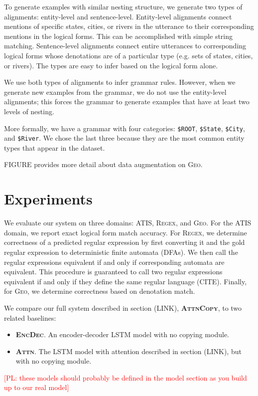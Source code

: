 \documentclass[11pt,letterpaper]{article}
\newcommand{\encdec}{\textsc{EncDec}\xspace}
\newcommand{\attn}{\textsc{Attn}\xspace}
\newcommand{\attncopy}{\textsc{AttnCopy}\xspace}
\newcommand{\atis}{\textsc{ATIS}\xspace}
\newcommand{\regex}{\textsc{Regex}\xspace}
\newcommand{\geo}{\textsc{Geo}\xspace}
\newcommand\pl[1]{\textcolor{red}{[PL: #1]}}
\begin{document}
To generate examples with similar nesting structure,
we generate two types of alignments: entity-level and sentence-level.
Entity-level alignments connect mentions of specific states, cities, or rivers
in the utterance to their corresponding mentions in the logical forms.
This can be accomplished with simple string matching.
Sentence-level alignments connect entire utterances to 
corresponding logical forms whose denotations are of a particular 
type (e.g. sets of states, cities, or rivers).
The types are easy to infer based on the logical form alone.

We use both types of alignments to infer grammar rules.
However, when we generate new examples from the grammar,
we do not use the entity-level alignments;
this forces the grammar to generate examples that have 
at least two levels of nesting.

More formally, we have a grammar with four categories:
\texttt{\$ROOT}, \texttt{\$State}, \texttt{\$City}, and \texttt{\$River}.
We chose the last three because they are the most common entity types
that appear in the dataset.  

FIGURE provides more detail about data augmentation on \geo.

\section{Experiments}
We evaluate our system on three domains: \atis, \regex, and \geo.
For the \atis domain, we report exact logical form match accuracy.
For \regex, we determine correctness of a predicted regular expression
by first converting it and the gold regular expression to
deterministic finite automata (DFAs).  We then call the regular expressions
equivalent if and only if corresponding automata are equivalent.
This procedure is guaranteed to call two regular expressions equivalent
if and only if they define the same regular language (CITE).
Finally, for \geo, we determine correctness based on denotation match.

We compare our full system described in section (LINK), \textbf{\attncopy}, 
to two related baselines:
\begin{itemize}
  \item \textbf{\encdec}.  An encoder-decoder LSTM model with no copying module.
  \item \textbf{\attn}.  The LSTM model with attention described in section (LINK),
     but with no copying module.
\end{itemize}
\pl{these models should probably be defined in the model section as you build up to our
real model}
\end{document}
